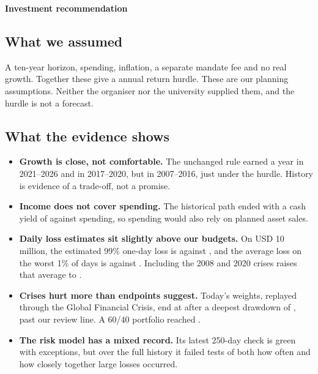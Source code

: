 \documentclass[11pt,a4paper]{article}
\begin{document}
\par\vspace{1pt}
{\sffamily\bfseries\LARGE\color{qeink} Investment recommendation\par}

\subsection{What we assumed}
A ten-year horizon, \qeSpending{} spending, \qeInflation{} inflation, a separate \qeFee{} mandate fee and no real growth. Together these give a \qeHurdle{} annual return hurdle. These are our planning assumptions. Neither the organiser nor the university supplied them, and the hurdle is not a forecast.

\subsection{What the evidence shows}
\begin{itemize}
\item \textbf{Growth is close, not comfortable.} The unchanged rule earned \qeEvalCagr{} a year in 2021--2026 and \qeSelCagr{} in 2017--2020, but \qeDevCagr{} in 2007--2016, just under the hurdle. History is evidence of a trade-off, not a promise.
\item \textbf{Income does not cover spending.} The historical path ended with a cash yield of \qeIncomeYield{} against \qeSpending{} spending, so spending would also rely on planned asset sales.
\item \textbf{Daily loss estimates sit slightly above our budgets.} On USD 10 million, the estimated 99\% one-day loss is \qeVarUsd{} against \qeBudgetVarUsd{}, and the average loss on the worst 1\% of days is \qeEsUsd{} against \qeBudgetEsUsd{}. Including the 2008 and 2020 crises raises that average to \qeFullEsUsd{}.
\item \textbf{Crises hurt more than endpoints suggest.} Today's weights, replayed through the Global Financial Crisis, end at \qeGfcReturn{} after a deepest drawdown of \qeGfcDrawdown{}, past our \qeBudgetDrawdown{} review line. A 60/40 portfolio reached \qeGfcDrawdownSixty{}.
\item \textbf{The risk model has a mixed record.} Its latest 250-day check is green with \qeBaselHs{} exceptions, but over the full history it failed tests of both how often and how closely together large losses occurred.
\end{itemize}
\end{document}
